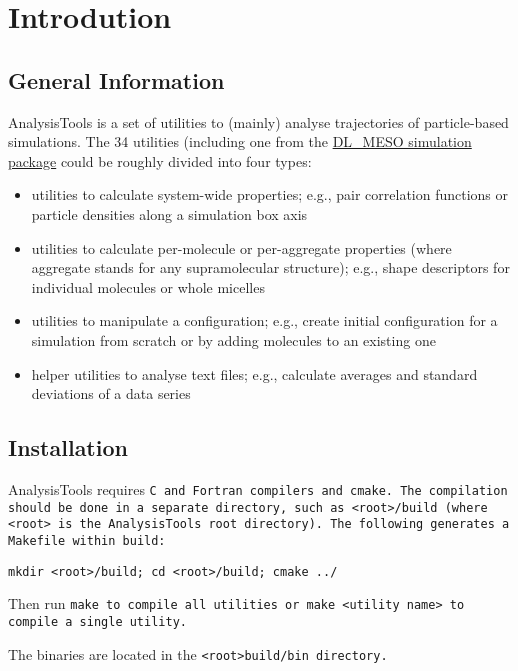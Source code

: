\chapter{Introdution}

\section{General Information}
AnalysisTools is a set of utilities to (mainly) analyse trajectories of
particle-based simulations. The 34 utilities (including one
from the \href{https://www.scd.stfc.ac.uk/Pages/DL_MESO.aspx}{DL\_MESO
simulation package} could be roughly divided into four types:

\begin{itemize}
  \item utilities to calculate system-wide properties; e.g., pair
    correlation functions or particle densities along a simulation box axis
  \item utilities to calculate per-molecule or per-aggregate properties
    (where aggregate stands for any supramolecular structure); e.g., shape
    descriptors for individual molecules or whole micelles
  \item utilities to manipulate a configuration; e.g., create initial
    configuration for a simulation from scratch or by adding molecules to
    an existing one
  \item helper utilities to analyse text files; e.g., calculate averages
    and standard deviations of a data series
\end{itemize}

\section{Installation}

AnalysisTools requires \tt{C} and \tt{Fortran} compilers and \tt{cmake}.
The compilation should be done in a separate directory, such as
\tt{<root>/build} (where \tt{<root>} is the AnalysisTools root
directory). The following generates a \tt{Makefile} within \tt{build}:

\tt{mkdir <root>/build; cd <root>/build; cmake ../}

Then run \tt{make} to compile all utilities or \tt{make <utility name>} to
compile a single utility.

The binaries are located in the \tt{<root>build/bin} directory.
